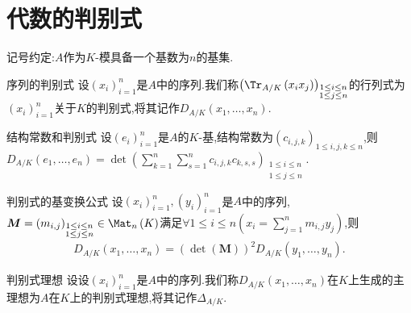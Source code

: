 \section{代数的判别式}

记号约定:$A$作为$K$-模具备一个基数为$n$的基集.

\begin{definition}{序列的判别式}{}
	设$\left(x_{i}\right)_{i=1}^{n}$是$A$中的序列.我们称$\left(\Tr_{A/K}\left(x_{i}x_{j}\right)\right)_{\substack{1\leq i\leq n\\1\leq j\leq n}}$的行列式为$\left(x_{i}\right)_{i=1}^{n}$关于$K$的判别式,将其记作$D_{A/K}\left(x_{1},\ldots,x_{n}\right)$.
\end{definition}

\begin{proposition}{结构常数和判别式}{}
	设$\left(e_{i}\right)_{i=1}^{n}$是$A$的$K$-基,结构常数为$\left(c_{i,j,k}\right)_{1\leq i,j,k\leq n}$,则$D_{A/K}\left(e_{1},\ldots,e_{n}\right)=\det\left(\sum\limits_{k=1}^{n}\sum\limits_{s=1}^{n}c_{i,j,k}c_{k,s,s}\right)_{\substack{1\leq i\leq n\\1\leq j\leq n}}$.
\end{proposition}

\begin{proposition}{判别式的基变换公式}{}
	设$\left(x_{i}\right)_{i=1}^{n},\left(y_{i}\right)_{i=1}^{n}$是$A$中的序列,$\boldsymbol{M}=\left(m_{i,j}\right)_{\substack{1\leq i\leq n\\1\leq j\leq n}}\in\Mat_{n}\left(K\right)$满足$\forall 1\leq i\leq n\left(x_{i}=\sum\limits_{j=1}^{n}m_{i,j}y_{j}\right)$,则
	\begin{align*}
		D_{A/K}\left(x_{1},\ldots,x_{n}\right)=\left(\det\left(\boldsymbol{M}\right)\right)^{2}D_{A/K}\left(y_{1},\ldots,y_{n}\right).
	\end{align*}
\end{proposition}

\begin{definition}{判别式理想}{}
	设设$\left(x_{i}\right)_{i=1}^{n}$是$A$中的序列.我们称$D_{A/K}\left(x_{1},\ldots,x_{n}\right)$在$K$上生成的主理想为$A$在$K$上的判别式理想,将其记作$\Delta_{A/K}$.
\end{definition}

